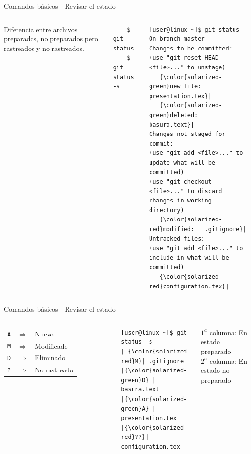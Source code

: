 \begin{frame}[fragile]{Comandos básicos - Revisar el estado}
  \begin{columns}[onlytextwidth]
  Diferencia entre archivos preparados, no preparados pero rastreados y no rastreados.
  \begin{verbatim}
    $ git status
    $ git status -s
  \end{verbatim}
  \vspace{0.3cm}
  \begin{verbatim}
[user@linux ~]$ git status
On branch master
Changes to be committed:
(use "git reset HEAD <file>..." to unstage)
|  {\color{solarized-green}new file:   presentation.tex}|
|  {\color{solarized-green}deleted:    basura.text}|
Changes not staged for commit:
(use "git add <file>..." to update what will be committed)
(use "git checkout -- <file>..." to discard changes in working directory)
|  {\color{solarized-red}modified:   .gitignore}|
Untracked files:
(use "git add <file>..." to include in what will be committed)
|  {\color{solarized-red}configuration.tex}|
  \end{verbatim}
  \end{columns}
\end{frame}

\begin{frame}[fragile]{Comandos básicos - Revisar el estado}
  \begin{columns}[onlytextwidth]
  \begin{tabular}{rcl}
    \texttt{A} & $\Rightarrow$ & Nuevo \\
    \texttt{M} & $\Rightarrow$ & Modificado \\
    \texttt{D} & $\Rightarrow$ & Eliminado \\
    \texttt{?} & $\Rightarrow$ & No rastreado \\
  \end{tabular}
  \begin{verbatim}
[user@linux ~]$ git status -s
| {\color{solarized-red}M}| .gitignore
|{\color{solarized-green}D} | basura.text
|{\color{solarized-green}A} | presentation.tex
|{\color{solarized-red}??}| configuration.tex
  \end{verbatim}
  \begin{center}
  $1^a$ columna: En estado preparado \\
  $2^a$ columna: En estado no preparado
  \end{center}
  \end{columns}
\end{frame}

